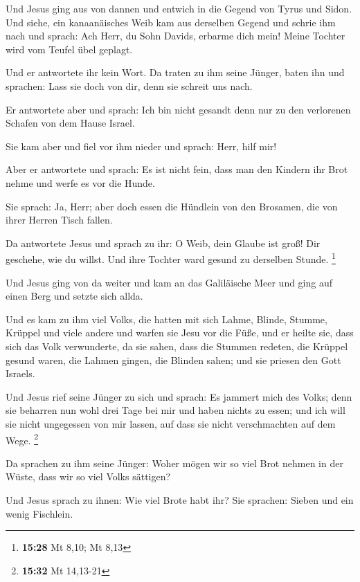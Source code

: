  Und Jesus ging aus von dannen und entwich in die Gegend
von Tyrus und Sidon.  Und siehe, ein kanaanäisches Weib
kam aus derselben Gegend und schrie ihm nach und sprach: Ach Herr, du
Sohn Davids, erbarme dich mein! Meine Tochter wird vom Teufel übel
geplagt.

 Und er antwortete ihr kein Wort. Da traten zu ihm seine
Jünger, baten ihn und sprachen: Lass sie doch von dir, denn sie schreit
uns nach.

 Er antwortete aber und sprach: Ich bin nicht gesandt
denn nur zu den verlorenen Schafen von dem Hause Israel.

 Sie kam aber und fiel vor ihm nieder und sprach: Herr,
hilf mir!

 Aber er antwortete und sprach: Es ist nicht fein, dass
man den Kindern ihr Brot nehme und werfe es vor die Hunde.

 Sie sprach: Ja, Herr; aber doch essen die Hündlein von
den Brosamen, die von ihrer Herren Tisch fallen.

 Da antwortete Jesus und sprach zu ihr: O Weib, dein
Glaube ist groß! Dir geschehe, wie du willst. Und ihre Tochter ward
gesund zu derselben Stunde. \footnote{\textbf{15:28} Mt 8,10; Mt 8,13}

 Und Jesus ging von da weiter und kam an das Galiläische
Meer und ging auf einen Berg und setzte sich allda.

 Und es kam zu ihm viel Volks, die hatten mit sich Lahme,
Blinde, Stumme, Krüppel und viele andere und warfen sie Jesu vor die
Füße, und er heilte sie,  dass sich das Volk verwunderte,
da sie sahen, dass die Stummen redeten, die Krüppel gesund waren, die
Lahmen gingen, die Blinden sahen; und sie priesen den Gott Israels.

 Und Jesus rief seine Jünger zu sich und sprach: Es
jammert mich des Volks; denn sie beharren nun wohl drei Tage bei mir und
haben nichts zu essen; und ich will sie nicht ungegessen von mir lassen,
auf dass sie nicht verschmachten auf dem Wege. \footnote{\textbf{15:32}
  Mt 14,13-21}

 Da sprachen zu ihm seine Jünger: Woher mögen wir so viel
Brot nehmen in der Wüste, dass wir so viel Volks sättigen?

 Und Jesus sprach zu ihnen: Wie viel Brote habt ihr? Sie
sprachen: Sieben und ein wenig Fischlein.

